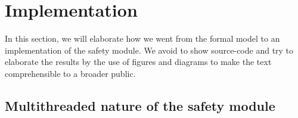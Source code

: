 \documentclass[12pt]{scrreprt}
\begin{document}
\newpage
\section{Implementation}
\label{Implementation}
In this section, we will elaborate how we went from the formal model to an implementation of the safety module. We avoid to show source-code and try to elaborate the results by the use of figures and diagrams to make the text comprehensible to a broader public.

\subsection{Multithreaded nature of the safety module}
\label{Multithreaded nature of the safety module}
\end{document}
